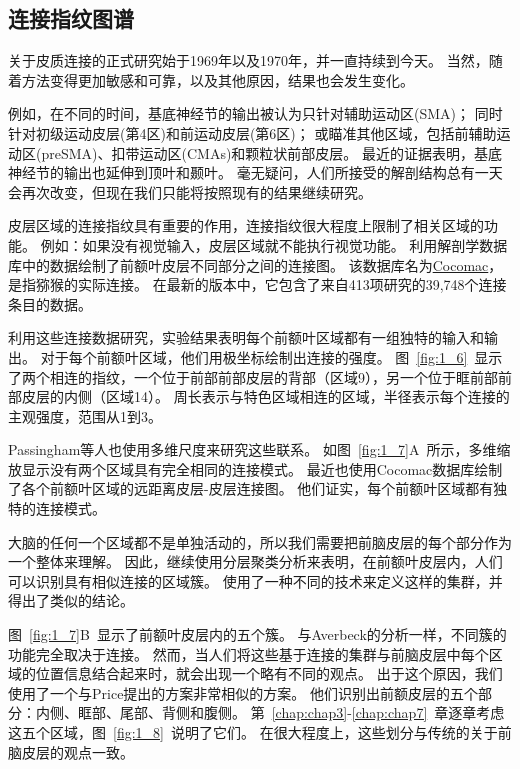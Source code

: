 \subsection{连接指纹图谱}

关于皮质连接的正式研究始于1969年\cite{pandya1969cortico}以及1970年\cite{jones1970anatomical}，并一直持续到今天。
当然，随着方法变得更加敏感和可靠，以及其他原因，结果也会发生变化。
\par
例如，在不同的时间，基底神经节的输出被认为只针对辅助运动区(SMA)\cite{schell1984origin}；
同时针对初级运动皮层(第4区)和前运动皮层(第6区)\cite{kemp1971connexions}；
或瞄准其他区域，包括前辅助运动区(preSMA)、扣带运动区(CMAs)和颗粒状前部皮层\cite{matelli1996thalamic,mcfarland2002thalamic}。
最近的证据表明，基底神经节的输出也延伸到顶叶\cite{clower2005basal}和颞叶\cite{middleton1996temporal}。
毫无疑问，人们所接受的解剖结构总有一天会再次改变，但现在我们只能将按照现有的结果继续研究。
\par
皮层区域的连接指纹具有重要的作用，连接指纹很大程度上限制了相关区域的功能。
例如：如果没有视觉输入，皮层区域就不能执行视觉功能。
利用解剖学数据库中的数据绘制了前额叶皮层不同部分之间的连接图\cite{2002Dorsal}。
该数据库名为\href{http://www.cocomac.org/}{Cocomac}，是指猕猴的实际连接。
在最新的版本中，它包含了来自413项研究的39,748个连接条目的数据。
\par
利用这些连接数据研究\cite{2002Dorsal}，实验结果表明每个前额叶区域都有一组独特的输入和输出。
对于每个前额叶区域，他们用极坐标绘制出连接的强度。
图~\ref{fig:1_6}~显示了两个相连的指纹，一个位于前部前部皮层的背部（区域9），另一个位于眶前部前部皮层的内侧（区域14）。 
周长表示与特色区域相连的区域，半径表示每个连接的主观强度，范围从1到3。

\par
Passingham等人也使用多维尺度来研究这些联系\cite{2002Dorsal}。
如图~\ref{fig:1_7}A~所示，多维缩放显示没有两个区域具有完全相同的连接模式。
最近也使用Cocomac数据库绘制了各个前额叶区域的远距离皮层-皮层连接图\cite{averbeck2008statistical}。
他们证实，每个前额叶区域都有独特的连接模式。


\par
大脑的任何一个区域都不是单独活动的，所以我们需要把前脑皮层的每个部分作为一个整体来理解。
因此，继续使用分层聚类分析来表明\cite{2002Dorsal}，在前额叶皮层内，人们可以识别具有相似连接的区域簇。
使用了一种不同的技术来定义这样的集群，并得出了类似的结论\cite{averbeck2008statistical}。


\par
图~\ref{fig:1_7}B~显示了前额叶皮层内的五个簇\cite{2002Dorsal}。
与Averbeck\cite{averbeck2008statistical}的分析一样，不同簇的功能完全取决于连接。
然而，当人们将这些基于连接的集群与前脑皮层中每个区域的位置信息结合起来时，就会出现一个略有不同的观点。
出于这个原因，我们使用了一个与Price\cite{price2010neurocircuitry}提出的方案非常相似的方案。
他们识别出前额皮层的五个部分：内侧、眶部、尾部、背侧和腹侧。
第~\ref{chap:chap3}-\ref{chap:chap7}~章逐章考虑这五个区域，图~\ref{fig:1_8}~说明了它们。
在很大程度上，这些划分与传统的关于前脑皮层的观点一致。


